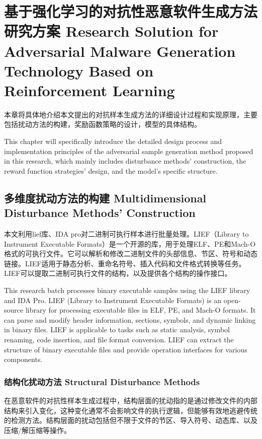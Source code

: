 \chapter{基于强化学习的对抗性恶意软件生成方法研究方案 Research Solution for Adversarial Malware Generation Technology Based on Reinforcement Learning}

本章将具体地介绍本文提出的对抗样本生成方法的详细设计过程和实现原理，主要包括扰动方法的构建，奖励函数策略的设计，模型的具体结构。

This chapter will specifically introduce the detailed design process and implementation principles of the adversarial sample generation method proposed in this research, which mainly includes disturbance methods' construction, the reward function strategies' design, and the model's specific structure.

\section{多维度扰动方法的构建 Multidimensional Disturbance Methods' Construction}

本文利用lief库、IDA pro对二进制可执行样本进行批量处理。LIEF（Library to Instrument Executable Formats）是一个开源的库，用于处理ELF、PE和Mach-O格式的可执行文件。它可以解析和修改二进制文件的头部信息、节区、符号和动态链接。LIEF适用于静态分析、重命名符号、插入代码和文件格式转换等任务。LIEF可以提取二进制可执行文件的结构，以及提供各个结构的操作接口。

This research batch processes binary executable samples using the LIEF library and IDA Pro. LIEF (Library to Instrument Executable Formats) is an open-source library for processing executable files in ELF, PE, and Mach-O formats. It can parse and modify header information, sections, symbols, and dynamic linking in binary files. LIEF is applicable to tasks such as static analysis, symbol renaming, code insertion, and file format conversion. LIEF can extract the structure of binary executable files and provide operation interfaces for various components.

\subsection{结构化扰动方法 Structural Disturbance Methods}

在恶意软件的对抗性样本生成过程中，结构层面的扰动指的是通过修改文件的内部结构来引入变化，这种变化通常不会影响文件的执行逻辑，但能够有效地逃避传统的检测方法。结构层面的扰动包括但不限于文件的节区、导入符号、动态库、以及压缩/解压缩等操作。

